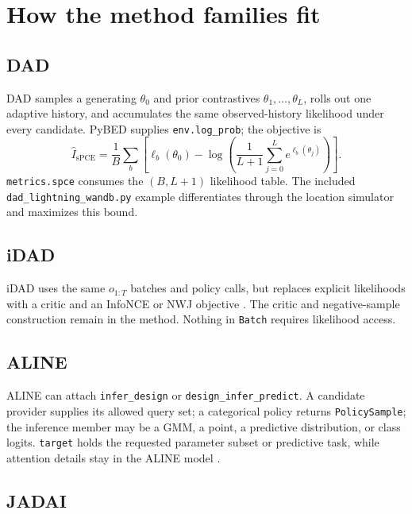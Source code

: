 \documentclass[11pt]{article}
\begin{document}
\section{How the method families fit}

\subsection{DAD}

DAD samples a generating $\theta_0$ and prior contrastives
$\theta_1,\ldots,\theta_L$, rolls out one adaptive history, and accumulates the
same observed-history likelihood under every candidate. PyBED supplies
\texttt{env.log\_prob}; the objective is
\begin{equation}
 \widehat I_{\mathrm{sPCE}}
 =\frac1B\sum_b\left[
 \ell_b(\theta_0)-\log\left(
 \frac1{L+1}\sum_{j=0}^{L}e^{\ell_b(\theta_j)}
 \right)\right].
\end{equation}
\texttt{metrics.spce} consumes the $(B,L+1)$ likelihood table. The included
\texttt{dad\_lightning\_wandb.py} example differentiates through the location
simulator and maximizes this bound.

\subsection{iDAD}

iDAD uses the same $o_{1:T}$ batches and policy calls, but replaces explicit
likelihoods with a critic and an InfoNCE or NWJ objective
\cite{ivanova2021idad}. The critic and negative-sample construction remain in the
method. Nothing in \texttt{Batch} requires likelihood access.

\subsection{ALINE}

ALINE can attach \texttt{infer\_design} or
\texttt{design\_infer\_predict}. A candidate provider supplies its allowed query
set; a categorical policy returns \texttt{PolicySample}; the inference member may
be a GMM, a point, a predictive distribution, or class logits. \texttt{target}
holds the requested parameter subset or predictive task, while attention details
stay in the ALINE model \cite{huang2025aline}.

\subsection{JADAI}
\end{document}
